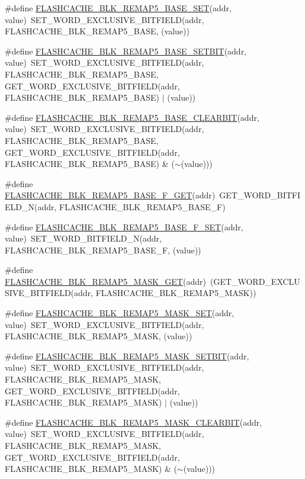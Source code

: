 \begin{DoxyCompactItemize}
\item 
\#define \hyperlink{a00549_af02ccd60b05c200c85211975203e7288}{FLASHCACHE\_\-BLK\_\-REMAP5\_\-BASE\_\-SET}(addr, value)~SET\_\-WORD\_\-EXCLUSIVE\_\-BITFIELD(addr, FLASHCACHE\_\-BLK\_\-REMAP5\_\-BASE, (value))
\item 
\#define \hyperlink{a00549_a6a374ff87e3f62bfbcaf3eabda6c0c0f}{FLASHCACHE\_\-BLK\_\-REMAP5\_\-BASE\_\-SETBIT}(addr, value)~SET\_\-WORD\_\-EXCLUSIVE\_\-BITFIELD(addr, FLASHCACHE\_\-BLK\_\-REMAP5\_\-BASE, GET\_\-WORD\_\-EXCLUSIVE\_\-BITFIELD(addr, FLASHCACHE\_\-BLK\_\-REMAP5\_\-BASE) $|$ (value))
\item 
\#define \hyperlink{a00549_a06c9ff417ddc6238d094361079107946}{FLASHCACHE\_\-BLK\_\-REMAP5\_\-BASE\_\-CLEARBIT}(addr, value)~SET\_\-WORD\_\-EXCLUSIVE\_\-BITFIELD(addr, FLASHCACHE\_\-BLK\_\-REMAP5\_\-BASE, GET\_\-WORD\_\-EXCLUSIVE\_\-BITFIELD(addr, FLASHCACHE\_\-BLK\_\-REMAP5\_\-BASE) \& ($\sim$(value)))
\item 
\#define \hyperlink{a00549_a2a26a3f97b5b07507fc5dad2d9875e92}{FLASHCACHE\_\-BLK\_\-REMAP5\_\-BASE\_\-F\_\-GET}(addr)~GET\_\-WORD\_\-BITFIELD\_\-N(addr, FLASHCACHE\_\-BLK\_\-REMAP5\_\-BASE\_\-F)
\item 
\#define \hyperlink{a00549_add827e988f26bd34803aa77e22f75c83}{FLASHCACHE\_\-BLK\_\-REMAP5\_\-BASE\_\-F\_\-SET}(addr, value)~SET\_\-WORD\_\-BITFIELD\_\-N(addr, FLASHCACHE\_\-BLK\_\-REMAP5\_\-BASE\_\-F, (value))
\item 
\#define \hyperlink{a00549_a38a175952780dfa389b72c9d7fc3c21b}{FLASHCACHE\_\-BLK\_\-REMAP5\_\-MASK\_\-GET}(addr)~(GET\_\-WORD\_\-EXCLUSIVE\_\-BITFIELD(addr, FLASHCACHE\_\-BLK\_\-REMAP5\_\-MASK))
\item 
\#define \hyperlink{a00549_a403a8331efc50950fb57d9c885da1a47}{FLASHCACHE\_\-BLK\_\-REMAP5\_\-MASK\_\-SET}(addr, value)~SET\_\-WORD\_\-EXCLUSIVE\_\-BITFIELD(addr, FLASHCACHE\_\-BLK\_\-REMAP5\_\-MASK, (value))
\item 
\#define \hyperlink{a00549_a0e1a5bd51e8074ed838c58f5e5264967}{FLASHCACHE\_\-BLK\_\-REMAP5\_\-MASK\_\-SETBIT}(addr, value)~SET\_\-WORD\_\-EXCLUSIVE\_\-BITFIELD(addr, FLASHCACHE\_\-BLK\_\-REMAP5\_\-MASK, GET\_\-WORD\_\-EXCLUSIVE\_\-BITFIELD(addr, FLASHCACHE\_\-BLK\_\-REMAP5\_\-MASK) $|$ (value))
\item 
\#define \hyperlink{a00549_a1bd16ca2a5519523959bdb61b8224b08}{FLASHCACHE\_\-BLK\_\-REMAP5\_\-MASK\_\-CLEARBIT}(addr, value)~SET\_\-WORD\_\-EXCLUSIVE\_\-BITFIELD(addr, FLASHCACHE\_\-BLK\_\-REMAP5\_\-MASK, GET\_\-WORD\_\-EXCLUSIVE\_\-BITFIELD(addr, FLASHCACHE\_\-BLK\_\-REMAP5\_\-MASK) \& ($\sim$(value)))

\end{DoxyCompactItemize}
